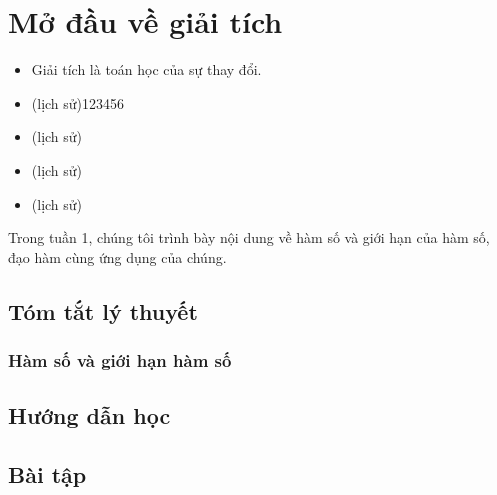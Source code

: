 \documentclass[a4paper,12pt]{book}
\begin{document}
\chapter{Mở đầu về giải tích}


\begin{itemize}
    \item Giải tích là toán học của sự thay đổi.

    \item (lịch sử)123456

    \item (lịch sử)

    \item (lịch sử)
    \item (lịch sử)

\end{itemize}
\noindent Trong tuần 1, chúng tôi trình bày nội dung về hàm số và giới hạn của hàm số, đạo hàm cùng ứng dụng của chúng.
\newpage
\section{Tóm tắt lý thuyết}
\subsection{Hàm số và giới hạn hàm số}

\section{Hướng dẫn học}
\section{Bài tập}
\end{document}
